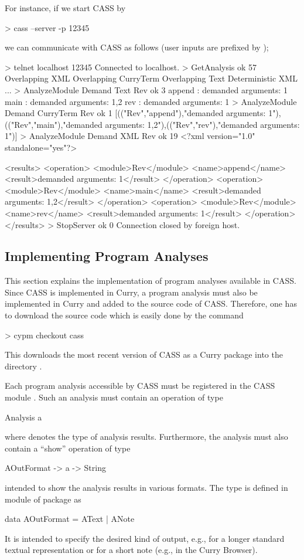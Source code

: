 For instance, if we start CASS by
\begin{curry}
> cass --server -p 12345
\end{curry}
we can communicate with CASS as follows (user inputs are prefixed by \ccode{>});
\begin{curry}
> telnet localhost 12345
Connected to localhost.
> GetAnalysis
ok 57
Overlapping XML
Overlapping CurryTerm
Overlapping Text
Deterministic XML
...
> AnalyzeModule Demand Text Rev
ok 3
append : demanded arguments: 1
main : demanded arguments: 1,2
rev : demanded arguments: 1
> AnalyzeModule Demand CurryTerm Rev
ok 1
[(("Rev","append"),"demanded arguments: 1"),(("Rev","main"),"demanded arguments: 1,2"),(("Rev","rev"),"demanded arguments: 1")]
> AnalyzeModule Demand XML Rev
ok 19
<?xml version="1.0" standalone="yes"?>

<results>
  <operation>
    <module>Rev</module>
    <name>append</name>
    <result>demanded arguments: 1</result>
  </operation>
  <operation>
    <module>Rev</module>
    <name>main</name>
    <result>demanded arguments: 1,2</result>
  </operation>
  <operation>
    <module>Rev</module>
    <name>rev</name>
    <result>demanded arguments: 1</result>
  </operation>
</results>
> StopServer
ok 0
Connection closed by foreign host.
\end{curry}


\subsection{Implementing Program Analyses}

This section explains the implementation of program analyses
available in CASS.
Since CASS is implemented in Curry, a program analysis
must also be implemented in Curry and added to the source code of CASS.
Therefore, one has to download the source code
which is easily done by the command
\begin{curry}
> cypm checkout cass
\end{curry}
This downloads the most recent version of CASS as a Curry package
into the directory .

Each program analysis accessible by CASS must be registered
in the CASS module .
Such an analysis must contain an operation of type
\begin{curry}
Analysis a
\end{curry}
where  denotes the type of analysis results.
Furthermore, the analysis must also contain a ``show'' operation of type
\begin{curry}
AOutFormat -> a -> String
\end{curry}
intended to show the analysis results in various formats.
The type  is defined in module
 of package  as
\begin{curry}
data AOutFormat = AText | ANote
\end{curry}
It is intended to specify the desired kind of output,
e.g.,  for a longer standard
textual representation or  for a short note
(e.g., in the Curry Browser).

